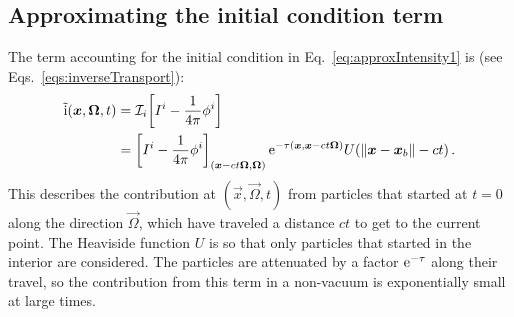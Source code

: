 \subsection{Approximating the initial condition term}\label{sec:derPoneIc}
The term accounting for the initial condition in
Eq.~\eqref{eq:approxIntensity1} is (see Eqs.~\eqref{eqs:inverseTransport}):
\begin{align*}
  \mathrm{ \tilde i }(\bm{x}, \bm{\Omega}, t) &=
    \mathcal{I}_{i}\!\left[I^i - \frac1{4\pi} \phi^i\right]
  \\
  &= \left[ I^i - \frac1{4\pi} \phi^i \right]_{( \bm{x} - ct
  \bm{\Omega}, \bm{\Omega})}
    \mathop{}\!\mathrm{e}^{ -\tau(\bm{x}, \bm{x} - ct \bm{\Omega})}
    U( \left\| \bm{x} - \bm{x}_b \right\| - ct)\,.
\end{align*}
This describes the contribution at $(\vec{x}, \vec{\Omega}, t)$ from particles
that started at $t=0$ along the direction $\vec{\Omega}$, which have
traveled a distance $ct$ to get to the current point. The Heaviside function
$U$ is so that only particles that started in the interior are considered. The
particles are attenuated by a factor $\mathop{}\!\mathrm{e}^{ -\tau}$ along their travel, so
the contribution from this term in a non-vacuum is exponentially small at large
times.

